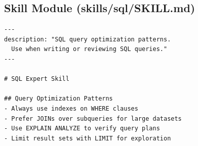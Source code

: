 \subsection{Skill Module (skills/sql/SKILL.md)}

\begin{lstlisting}
---
description: "SQL query optimization patterns.
  Use when writing or reviewing SQL queries."
---

# SQL Expert Skill

## Query Optimization Patterns
- Always use indexes on WHERE clauses
- Prefer JOINs over subqueries for large datasets
- Use EXPLAIN ANALYZE to verify query plans
- Limit result sets with LIMIT for exploration
\end{lstlisting}
